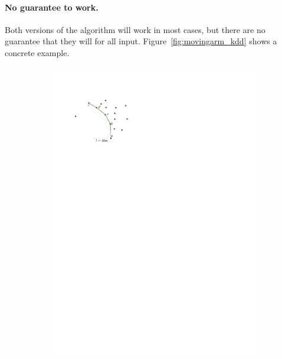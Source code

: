 %

\paragraph{No guarantee to work.} 
Both versions of the algorithm will work in most cases, but there are no guarantee that they will for all input.
Figure~\ref{fig:movingarm_kdd} shows a concrete example.
\begin{figure}
  \centering
  \begin{subfigure}[b]{0.3\linewidth}
    \centering
    \includegraphics[page=4,width=\textwidth]{figs/movingarm.pdf}
    \caption{}
  \end{subfigure}
  \qquad
  \begin{subfigure}[b]{0.3\linewidth}
    \centering

\end{subfigure}
\end{figure}
